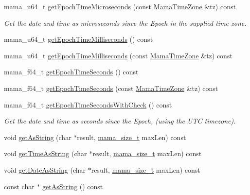 \begin{DoxyCompactItemize}
mama\_\-u64\_\-t \hyperlink{classWombat_1_1MamaDateTime_ad083a6993f7bbe2f0c5c43e7d7782bf3}{getEpochTimeMicroseconds} (const \hyperlink{classWombat_1_1MamaTimeZone}{MamaTimeZone} \&tz) const 
\begin{DoxyCompactList}\small\item\em Get the date and time as microseconds since the Epoch in the supplied time zone. \item\end{DoxyCompactList}\item 
mama\_\-u64\_\-t \hyperlink{classWombat_1_1MamaDateTime_afef0998864cc6aa6a9bc02ec560f4406}{getEpochTimeMilliseconds} () const 
\item 
mama\_\-u64\_\-t \hyperlink{classWombat_1_1MamaDateTime_ae558d0f45e1fceb29bb0671f9c20dc2f}{getEpochTimeMilliseconds} (const \hyperlink{classWombat_1_1MamaTimeZone}{MamaTimeZone} \&tz) const 
\item 
mama\_\-f64\_\-t \hyperlink{classWombat_1_1MamaDateTime_acab5e332634fb075f7e0b93d7b1afbcb}{getEpochTimeSeconds} () const 
\item 
mama\_\-f64\_\-t \hyperlink{classWombat_1_1MamaDateTime_a94e87557d8bc08a050933b166c79cc44}{getEpochTimeSeconds} (const \hyperlink{classWombat_1_1MamaTimeZone}{MamaTimeZone} \&tz) const 
\item 
mama\_\-f64\_\-t \hyperlink{classWombat_1_1MamaDateTime_afb79d97c80195c594bd155aefad733db}{getEpochTimeSecondsWithCheck} () const 
\begin{DoxyCompactList}\small\item\em Get the date and time as seconds since the Epoch, (using the UTC timezone). \item\end{DoxyCompactList}\item 
void \hyperlink{classWombat_1_1MamaDateTime_a71d88aab06c9b370d39dca53ab200894}{getAsString} (char $\ast$result, \hyperlink{classmama__size__t}{mama\_\-size\_\-t} maxLen) const 
\item 
void \hyperlink{classWombat_1_1MamaDateTime_af4390447a4a46a24e01212cf732a32f5}{getTimeAsString} (char $\ast$result, \hyperlink{classmama__size__t}{mama\_\-size\_\-t} maxLen) const 
\item 
void \hyperlink{classWombat_1_1MamaDateTime_a12460a0fdf39d0faee5ea07bc3e3a180}{getDateAsString} (char $\ast$result, \hyperlink{classmama__size__t}{mama\_\-size\_\-t} maxLen) const 
\item 
const char $\ast$ \hyperlink{classWombat_1_1MamaDateTime_ae88f2b09fb7c3c12f7c3f0cbfdea8147}{getAsString} () const 

\end{DoxyCompactItemize}
